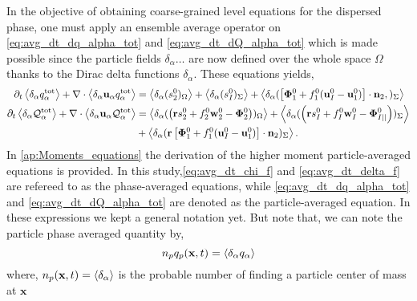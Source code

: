 In the objective of obtaining coarse-grained level equations for the dispersed phase, one must apply an ensemble average operator on \ref{eq:avg_dt_dq_alpha_tot} and \ref{eq:avg_dt_dQ_alpha_tot} which is made possible since the particle fields $\delta_\alpha \ldots$ are now defined over the whole space $\Omega$ thanks to the Dirac delta functions $\delta_\alpha$.  
These equations yields,
\begin{align}
    \partial_t \left<\delta_\alpha  q_\alpha^\text{tot}\right>
    + \mathbf{\nabla}\cdot \left<\delta_\alpha\textbf{u}_\alpha q_\alpha^\text{tot}\right>
    &= \left<\delta_\alpha (  s_2^0  )_{\Omega}\right>
    + \left<\delta_\alpha (  s_I^0  )_{\Sigma}\right>
    + \left<\delta_\alpha (  \left[\mathbf{\Phi}_1^0 + f_1^0 (\textbf{u}_I^0-\textbf{u}_1^0) \right] \cdot \textbf{n}_2 , )_{\Sigma}\right>
    \label{eq:avg_dt_dq_alpha_tot}\\
    \partial_t \left<\delta_\alpha \mathcal{Q}_\alpha^\text{tot}\right>
    + \mathbf{\nabla}\cdot \left<\delta_\alpha\textbf{u}_\alpha\mathcal{Q}_\alpha^\text{tot}\right>
    &=\left<\delta_\alpha (  \left(
        \textbf{r} s_2^0         
        + f_2^0  \textbf{w}_2^0 
        - \mathbf{\Phi}_2^0
    \right)  )_{\Omega}\right>
    + \left<\delta_\alpha (  \left(
        \textbf{r}s_I^0
        + f_I^0 \textbf{w}_I^0
        - \mathbf{\Phi}_{I||}^0
    \right)  )_{\Sigma}\right>\nonumber\\
    &+ \left<\delta_\alpha (  \textbf{r} \left[
        \mathbf{\Phi}_1^0
        + f_1^0 (\textbf{u}_I^0-\textbf{u}_1^0)
    \right]\cdot \textbf{n}_2   )_{\Sigma}\right>.
    \label{eq:avg_dt_dQ_alpha_tot}
\end{align}
In \ref{ap:Moments_equations} the derivation of the higher moment particle-averaged equations is provided. 
In this study,\ref{eq:avg_dt_chi_f} and \ref{eq:avg_dt_delta_f} are refereed to as the phase-averaged equations, while \ref{eq:avg_dt_dq_alpha_tot} and \ref{eq:avg_dt_dQ_alpha_tot} are denoted as the particle-averaged equation. 
In these expressions we kept a general notation yet. 
But note that, we can note the particle phase averaged quantity by,
\begin{equation}
     n_p q_p(\textbf{x},t) = \left<\delta_\alpha q_\alpha\right>
     \label{eq:p_avg}
\end{equation}
where, $n_p(\textbf{x},t) = \left<\delta_\alpha\right>$ is the probable number of finding a particle center of mass at $\textbf{x}$
